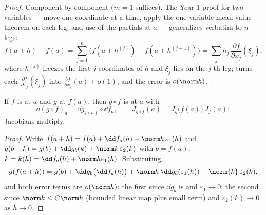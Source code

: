 \begin{proof}
Component by component ($m = 1$ suffices). The Year 1 proof for two
variables --- move one coordinate at a time, apply the one-variable
mean value theorem on each leg, and use  of the partials
at $a$ --- generalizes verbatim to $n$ legs:
\[
f(a + h) - f(a) = \sum_{j=1}^{n} \bigl(f(a + h^{(j)}) - f(a +
h^{(j-1)})\bigr)
= \sum_j h_j\,\frac{\partial f}{\partial x_j}(\xi_j),
\]
where $h^{(j)}$ freezes the first $j$ coordinates of $h$ and
$\xi_j$ lies on the $j$-th leg;  turns each
$\frac{\partial f}{\partial x_j}(\xi_j)$ into $\frac{\partial
f}{\partial x_j}(a) + o(1)$, and the error is $o(\norm h)$.
\end{proof}

\begin{theorem}\label{thm:b2:diffcalc:chainrule}
If $f$ is  at $a$ and $g$ at $f(a)$, then $g \circ f$
is  at $a$ with
\[
\dd(g \circ f)_a = \dd g_{f(a)} \circ \dd f_a ,
\qquad
J_{g\circ f}(a) = J_g\bigl(f(a)\bigr)\,J_f(a) :
\]
Jacobians multiply.
\end{theorem}

\begin{proof}
Write $f(a + h) = f(a) + \dd f_a(h) + \norm h\,\varepsilon_1(h)$
and $g(b + k) = g(b) + \dd g_b(k) + \norm k\,\varepsilon_2(k)$ with
$b = f(a)$, $k = k(h) = \dd f_a(h) + \norm h \varepsilon_1(h)$.
Substituting,
\[
g(f(a+h)) = g(b) + \dd g_b\bigl(\dd f_a(h)\bigr)
+ \norm h\,\dd g_b(\varepsilon_1(h)) + \norm{k}\,\varepsilon_2(k),
\]
and both error terms are $o(\norm h)$: the first since $\dd g_b$ is
 and $\varepsilon_1 \to 0$; the second since $\norm k
\leq C\norm h$ (bounded linear map plus small term) and
$\varepsilon_2(k) \to 0$ as $h \to 0$.
\end{proof}

